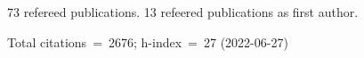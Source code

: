 73 refereed publications. 13 refeered publications as first author.

Total citations~=~2676; h-index~=~27 (2022-06-27)